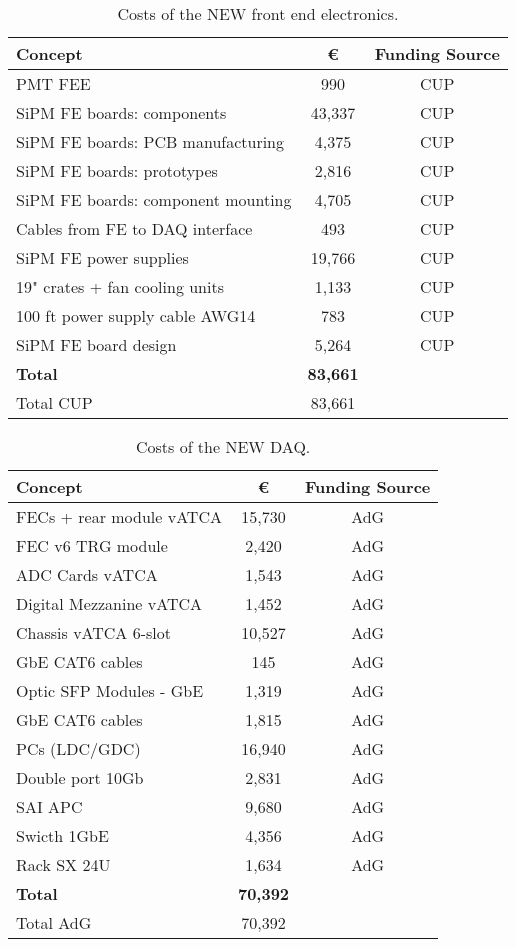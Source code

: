 \begin{table}[h!]
\begin{center}
\begin{tabular}{|l|c|c|}
\hline
 Concept & \euro & Funding Source \\
 \hline
 PMT FEE & 990 & CUP \\
 SiPM FE boards:  components	&	43,337 & CUP \\
SiPM FE boards: PCB manufacturing &	4,375 & CUP \\
SiPM FE boards: prototypes &	2,816 & CUP \\
SiPM FE boards: component mounting &	4,705 & CUP \\
Cables from FE to DAQ interface &	493 & CUP \\
SiPM FE power supplies & 19,766 & CUP \\
19" crates + fan cooling units	& 1,133 & CUP \\
100 ft power supply cable AWG14 &	783 & CUP \\
SiPM FE board design &	5,264 & CUP \\
  \hline
{\bf Total}	&	{\bf 83,661}	& \\
 Total CUP	&	83,661	& \\
 \hline\hline
\end{tabular}  
\caption{Costs of the NEW front end electronics.}
\label{tab.new:FEE}
\end{center}
\end{table} 

\begin{table}[h!]
\begin{center}
\begin{tabular}{|l|c|c|}
\hline
 Concept & \euro & Funding Source \\
 \hline
FECs + rear module vATCA &	15,730 & AdG \\
FEC v6 TRG module		&	2,420 & AdG \\
ADC Cards vATCA & 	1,543 & AdG \\
Digital Mezzanine vATCA & 1,452 & AdG \\
Chassis vATCA 6-slot	&	10,527 & AdG \\
GbE CAT6 cables		& 145 & AdG \\
Optic SFP Modules - GbE	& 1,319 & AdG \\
GbE CAT6 cables &	1,815 & AdG \\
PCs (LDC/GDC) & 16,940 & AdG \\
Double port 10Gb &	2,831 & AdG \\
SAI	APC	&	9,680 & AdG \\
Swicth 1GbE	& 4,356& AdG \\
Rack SX 24U & 1,634 & AdG \\
  \hline
{\bf Total} &	{\bf 70,392}	& \\
 Total AdG	&	70,392	& \\
 \hline\hline
\end{tabular}  
\caption{Costs of the NEW DAQ.}
\label{tab.new:DAQ}
\end{center}
\end{table} 




